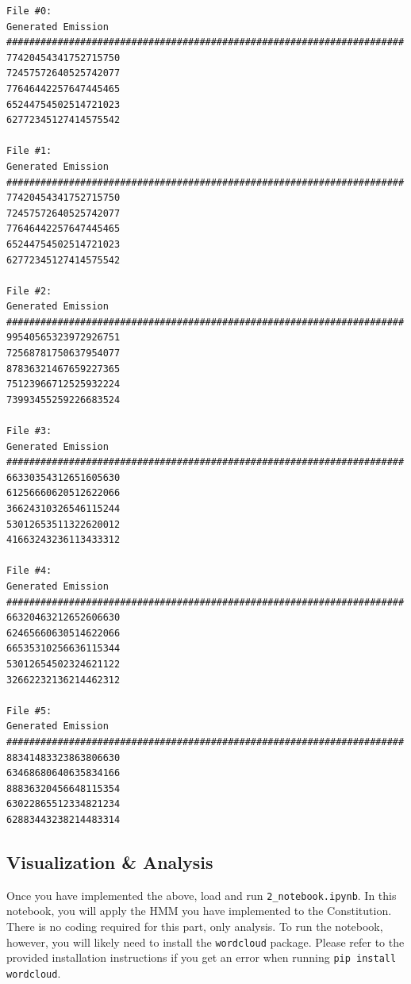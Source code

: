 \begin{solution}
  \begin{verbatim}
File #0:
Generated Emission            
######################################################################
77420454341752715750          
72457572640525742077          
77646442257647445465          
65244754502514721023          
62772345127414575542          

File #1:
Generated Emission            
######################################################################
77420454341752715750          
72457572640525742077          
77646442257647445465          
65244754502514721023          
62772345127414575542          

File #2:
Generated Emission            
######################################################################
99540565323972926751          
72568781750637954077          
87836321467659227365          
75123966712525932224          
73993455259226683524          

File #3:
Generated Emission            
######################################################################
66330354312651605630          
61256660620512622066          
36624310326546115244          
53012653511322620012          
41663243236113433312          

File #4:
Generated Emission            
######################################################################
66320463212652606630          
62465660630514622066          
66535310256636115344          
53012654502324621122          
32662232136214462312          

File #5:
Generated Emission            
######################################################################
88341483323863806630          
63468680640635834166          
88836320456648115354          
63022865512334821234          
62883443238214483314          
  \end{verbatim}
\end{solution}

\subsection{Visualization \& Analysis}

Once you have implemented the above, load and run \texttt{2_notebook.ipynb}. In this notebook, you will apply the HMM you have implemented to the Constitution. There is no coding required for this part, only analysis. To run the notebook, however, you will likely need to install the \texttt{wordcloud} package. Please refer to the provided installation instructions if you get an error when running \texttt{pip install wordcloud}.

